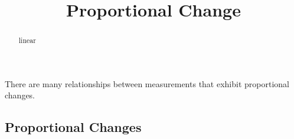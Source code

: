 \documentclass{ximera}
\title{Proportional Change}
\begin{document}
\begin{abstract}
linear
\end{abstract}
\maketitle




There are many relationships between measurements that exhibit proportional changes.  







\subsection*{Proportional Changes}
\end{document}
